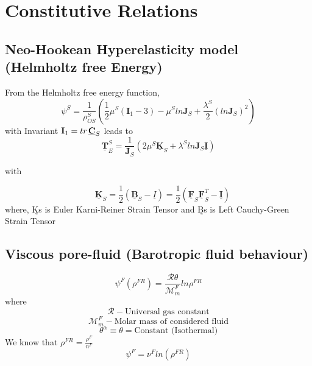 \documentclass[12pt]{article}
\begin{document}
\section{Constitutive Relations}
\subsection{ Neo-Hookean Hyperelasticity model (Helmholtz free Energy)}
From the Helmholtz free energy function,
\begin{equation}
	{\psi^S}={\frac{1}{\rho_{OS}^{S}}}\left({{{\frac{1}{2}}{\mu^S}{({\mathbf{I}_{1}}-{3})}}-{\mu^S}{ln\mathbf{J}_S}+{\frac{\lambda^S}{2}}{(ln\mathbf{J}_S)^2}}\right)
\end{equation}
with Invariant $\mathbf{I}_1 = tr\hspace{0.5mm}\underline{\mathbf{C}}_S$ leads to
\begin{equation*}
	{\underline{\mathbf{T}}_{E}^{S} = {\frac{1}{\mathbf{J}_S}}{({2{\mu^{S}}{\underline{\mathbf{K}}_S}}+{{\lambda^S}{ln \mathbf{J}_S}{\underline{\mathbf{I}}}})}}
\end{equation*}  

\textrm{with}

\begin{equation}   
	{ \quad{\underline{\mathbf{K}}_S}=\frac{1}{2}{(\underline{\mathbf{B}}_{S}-{\underline{I}})} = \frac{1}{2}{({\underline{\mathbf{F}}_{S}}{\underline{\mathbf{F}}_{S}^{T}}-{\underline{\mathbf{I}}})}}
\end{equation}
\textrm{where, K̰s is Euler Karni-Reiner Strain Tensor and B̰s is Left Cauchy-Green Strain Tensor}

\subsection{Viscous pore-fluid (Barotropic fluid behaviour)}
\begin{equation}
	{\psi^F}{(\rho^{FR})}= {\frac{\mathcal{R}\theta}{\mathcal{M}_{m}^{F}}}{ln {\rho^{FR}}}
\end{equation}
where
\begin{equation*}
	\mathcal{R} - \textrm{Universal gas constant}
\end{equation*}
\begin{equation*}
	{\mathcal{M}_{m}^{F}} - \textrm{Molar mass of considered fluid}
\end{equation*}
\begin{equation*}
	\theta^\alpha \equiv \theta = \textrm{Constant (Isothermal)}
\end{equation*}
We know that ${\rho^{FR}} = \frac{\rho^F}{n^F}$
\begin{equation}
	\boxed{{{\psi^F}}={\nu^{F}}{ln \left({\rho^{FR}}\right)}}
\end{equation}
\end{document}
